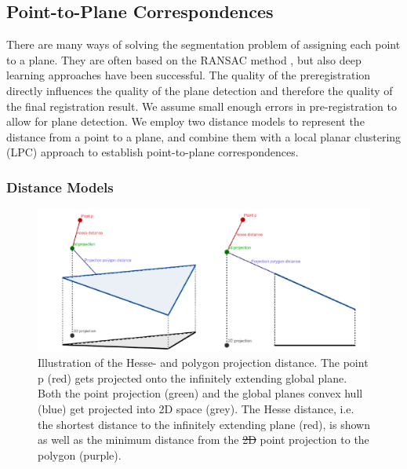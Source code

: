 \documentclass[5p]{elsarticle}
\providecommand{\DIFaddtex}[1]{{\protect\color{blue}\uwave{#1}}} %
\providecommand{\DIFdeltex}[1]{{\protect\color{red}\sout{#1}}}                      %
\providecommand{\DIFaddFL}[1]{\DIFadd{#1}} %
\providecommand{\DIFdelFL}[1]{\DIFdel{#1}} %
\providecommand{\DIFaddbeginFL}{} %
\providecommand{\DIFaddendFL}{} %
\providecommand{\DIFdelbeginFL}{} %
\providecommand{\DIFdelendFL}{} %
\providecommand{\DIFadd}[1]{\texorpdfstring{\DIFaddtex{#1}}{#1}} %
\providecommand{\DIFdel}[1]{\texorpdfstring{\DIFdeltex{#1}}{}} %
\begin{document}
\subsection{Point-to-Plane Correspondences}\label{sec:point-to-plane-correspondences}


There are many ways of solving the segmentation problem of assigning each point to a plane. They are often based on the RANSAC method \cite{Honti2018}, \cite{Gaspers2011} but also deep learning approaches \cite{Engelmann2018} have been successful.
The quality of the preregistration directly influences the quality of the plane detection and therefore the quality of the final registration result.
We assume small enough errors in pre-registration to allow for plane detection.
We employ two distance models to represent the distance from a point to a plane, and combine them with a local planar clustering (LPC) approach to establish point-to-plane correspondences.

\subsubsection{Distance Models}

\begin{figure}
	\centering
	\includegraphics[width=\textwidth]{images/project}
	\caption{Illustration of the Hesse- and polygon projection distance. The point p (red) gets projected onto the infinitely extending global plane. Both the point projection (green) and the global planes convex hull (blue) get projected into 2D space (grey). The Hesse distance, i.e. the shortest distance to the infinitely extending plane (red), is shown as well as the minimum distance from the \DIFdelbeginFL \DIFdelFL{2D }\DIFdelendFL \DIFaddbeginFL \DIFaddFL{3D }\DIFaddendFL point projection to the polygon (purple).}
	\label{fig:proj}
\end{figure}
\end{document}
